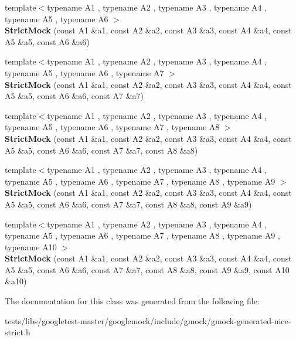 \begin{DoxyCompactItemize}
\item 
\mbox{\label{classtesting_1_1StrictMock_a17b452e1e2f57d7d10f7209587376eef}} 
{\footnotesize template$<$typename A1 , typename A2 , typename A3 , typename A4 , typename A5 , typename A6 $>$ }\\{\bfseries Strict\+Mock} (const A1 \&a1, const A2 \&a2, const A3 \&a3, const A4 \&a4, const A5 \&a5, const A6 \&a6)
\item 
\mbox{\label{classtesting_1_1StrictMock_a4af48752fc22815250369292b9c064bc}} 
{\footnotesize template$<$typename A1 , typename A2 , typename A3 , typename A4 , typename A5 , typename A6 , typename A7 $>$ }\\{\bfseries Strict\+Mock} (const A1 \&a1, const A2 \&a2, const A3 \&a3, const A4 \&a4, const A5 \&a5, const A6 \&a6, const A7 \&a7)
\item 
\mbox{\label{classtesting_1_1StrictMock_aac6eaaad3e94491ada7bb43ee6149775}} 
{\footnotesize template$<$typename A1 , typename A2 , typename A3 , typename A4 , typename A5 , typename A6 , typename A7 , typename A8 $>$ }\\{\bfseries Strict\+Mock} (const A1 \&a1, const A2 \&a2, const A3 \&a3, const A4 \&a4, const A5 \&a5, const A6 \&a6, const A7 \&a7, const A8 \&a8)
\item 
\mbox{\label{classtesting_1_1StrictMock_a4129f247ae087d586fdb04f450422d3e}} 
{\footnotesize template$<$typename A1 , typename A2 , typename A3 , typename A4 , typename A5 , typename A6 , typename A7 , typename A8 , typename A9 $>$ }\\{\bfseries Strict\+Mock} (const A1 \&a1, const A2 \&a2, const A3 \&a3, const A4 \&a4, const A5 \&a5, const A6 \&a6, const A7 \&a7, const A8 \&a8, const A9 \&a9)
\item 
\mbox{\label{classtesting_1_1StrictMock_a4936b0a5622b39e974deae12ecb1430b}} 
{\footnotesize template$<$typename A1 , typename A2 , typename A3 , typename A4 , typename A5 , typename A6 , typename A7 , typename A8 , typename A9 , typename A10 $>$ }\\{\bfseries Strict\+Mock} (const A1 \&a1, const A2 \&a2, const A3 \&a3, const A4 \&a4, const A5 \&a5, const A6 \&a6, const A7 \&a7, const A8 \&a8, const A9 \&a9, const A10 \&a10)
\end{DoxyCompactItemize}


The documentation for this class was generated from the following file\+:\begin{DoxyCompactItemize}
\item 
tests/libs/googletest-\/master/googlemock/include/gmock/gmock-\/generated-\/nice-\/strict.\+h\end{DoxyCompactItemize}
